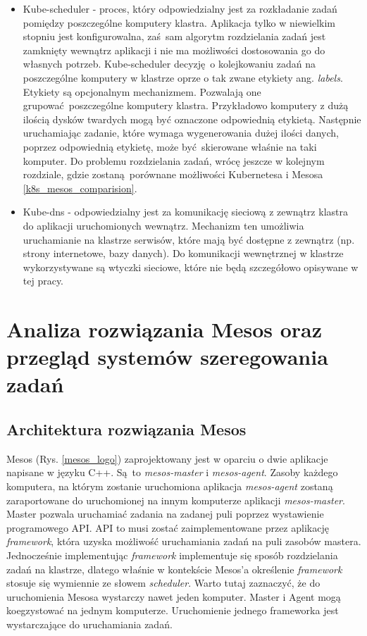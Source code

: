 \documentclass[10pt,a4paper,titlepage,twoside]{report}
\begin{document}
\begin{itemize}
\item Kube-scheduler - proces, który odpowiedzialny jest za rozkładanie zadań pomiędzy poszczególne komputery klastra. Aplikacja tylko w niewielkim stopniu jest konfigurowalna, zaś sam algorytm rozdzielania zadań jest zamknięty wewnątrz aplikacji i nie ma możliwości dostosowania go do własnych potrzeb. Kube-scheduler decyzję o kolejkowaniu zadań na poszczególne komputery w klastrze oprze o tak zwane etykiety ang. \textit{labels}. Etykiety są opcjonalnym mechanizmem. Pozwalają one grupować poszczególne komputery klastra. Przykładowo komputery z dużą ilością dysków twardych mogą być oznaczone odpowiednią etykietą. Następnie uruchamiając zadanie, które wymaga wygenerowania dużej ilości danych, poprzez odpowiednią etykietę, może być skierowane właśnie na taki komputer. Do problemu rozdzielania zadań, wrócę jeszcze w kolejnym rozdziale, gdzie zostaną porównane możliwości Kubernetesa i Mesosa \ref{k8s_mesos_comparision}.
\item Kube-dns - odpowiedzialny jest za komunikację sieciową z zewnątrz klastra do aplikacji uruchomionych wewnątrz. Mechanizm ten umożliwia uruchamianie na klastrze serwisów, które mają być dostępne z zewnątrz (np. strony internetowe, bazy danych). Do komunikacji wewnętrznej w klastrze wykorzystywane są wtyczki sieciowe, które nie będą szczegółowo opisywane w tej pracy.
\end{itemize}

\onehalfspacing
\chapter{Analiza rozwiązania Mesos oraz przegląd systemów szeregowania zadań}

\section{Architektura rozwiązania Mesos}

Mesos (Rys. \ref{mesos_logo}) zaprojektowany jest w oparciu o dwie aplikacje napisane w języku C++. Są to \textit{mesos-master} i \textit{mesos-agent}. Zasoby każdego komputera, na którym zostanie uruchomiona aplikacja \textit{mesos-agent} zostaną zaraportowane do uruchomionej na innym komputerze aplikacji \textit{mesos-master}. Master pozwala uruchamiać zadania na zadanej puli poprzez wystawienie programowego API. API to musi zostać zaimplementowane przez aplikację \textit{framework}, która uzyska możliwość uruchamiania zadań na puli zasobów mastera. Jednocześnie implementując \textit{framework} implementuje się sposób rozdzielania zadań na klastrze, dlatego właśnie w kontekście Mesos'a określenie \textit{framework} stosuje się wymiennie ze słowem \textit{scheduler}. Warto tutaj zaznaczyć, że do uruchomienia Mesosa wystarczy nawet jeden komputer. Master i Agent mogą koegzystować na jednym komputerze. Uruchomienie jednego frameworka jest wystarczające do uruchamiania zadań. 
\end{document}
